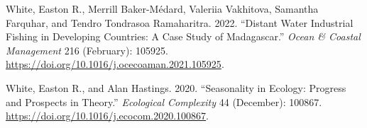 \documentclass[
]{article}
\newlength{\cslhangindent}
\newlength{\cslentryspacingunit} %
\newenvironment{CSLReferences}[2] %
 {%
  \setlength{\parindent}{0pt}
  \ifodd #1
  \let\oldpar\par
  \def\par{\hangindent=\cslhangindent\oldpar}
  \fi
  \setlength{\parskip}{#2\cslentryspacingunit}
 }%
 {}
\begin{document}
\begin{CSLReferences}{1}{0}
\leavevmode{}%
White, Easton R., Merrill Baker-Médard, Valeriia Vakhitova, Samantha Farquhar, and Tendro Tondrasoa Ramaharitra. 2022. {``Distant Water Industrial Fishing in Developing Countries: {A} Case Study of {Madagascar}.''} \emph{Ocean \& Coastal Management} 216 (February): 105925. \url{https://doi.org/10.1016/j.ocecoaman.2021.105925}.

\leavevmode{}%
White, Easton R., and Alan Hastings. 2020. {``Seasonality in Ecology: {Progress} and Prospects in Theory.''} \emph{Ecological Complexity} 44 (December): 100867. \url{https://doi.org/10.1016/j.ecocom.2020.100867}.

\end{CSLReferences}
\end{document}
